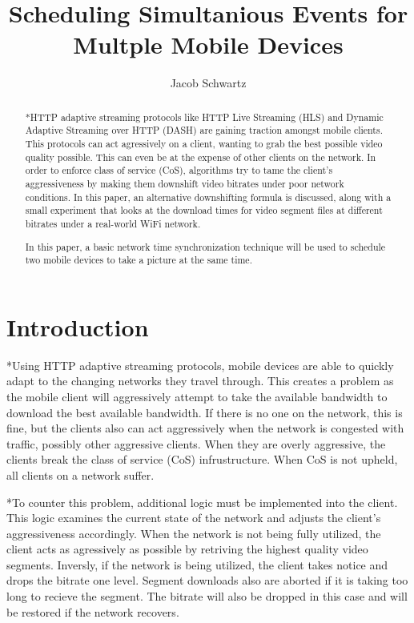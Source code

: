 \documentclass[10pt]{IEEEtran}
\begin{document}
\title{Scheduling Simultanious Events for Multple Mobile Devices}
\author{Jacob Schwartz}
\maketitle

\begin{abstract}
*HTTP adaptive streaming protocols like HTTP Live Streaming (HLS) and Dynamic 
Adaptive Streaming over HTTP (DASH) are gaining traction amongst mobile clients.
This protocols can act agressively on a client, wanting to grab the best
possible video quality possible. This can even be at the expense of other
clients on the network. In order to enforce class of service (CoS), algorithms
try to tame the client's aggressiveness by making them downshift video bitrates
under poor network conditions. In this paper, an alternative downshifting
formula is discussed, along with a small experiment that looks at the download
times for video segment files at different bitrates under a real-world WiFi
network.


In this paper, a basic network time synchronization technique will be used to
schedule two mobile devices to take a picture at the same time.
\end{abstract}

\section{Introduction}
*Using HTTP adaptive streaming protocols, mobile devices are able to quickly
adapt to the changing networks they travel through. This creates a problem as
the mobile client will aggressively attempt to take the available bandwidth to 
download the best available bandwidth. If there is no one on the network, this
is fine, but the clients also can act aggressively when the network is congested
with traffic, possibly other aggressive clients. When they are overly 
aggressive, the clients break the class of service (CoS) infrustructure. When 
CoS is not upheld, all clients on a network suffer. 

*To counter this problem, additional logic must be implemented into the client.
This logic examines the current state of the network and adjusts the client's
aggressiveness accordingly. When the network is not being fully utilized, the
client acts as agressively as possible by retriving the highest quality video
segments. Inversly, if the network is being utilized, the client takes notice
and drops the bitrate one level. Segment downloads also are aborted if it is
taking too long to recieve the segment. The bitrate will also be dropped in this
case and will be restored if the network recovers.
\end{document}
